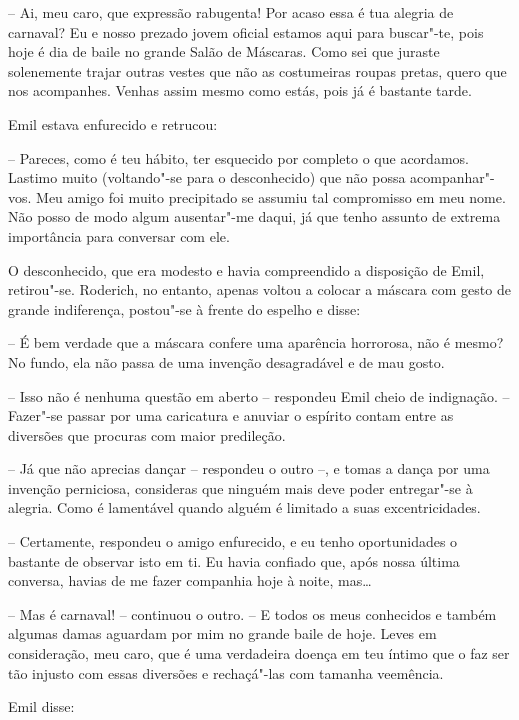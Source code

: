 -- Ai, meu caro, que expressão rabugenta! Por acaso essa é tua
alegria de carnaval? Eu e nosso prezado jovem oficial estamos aqui para
buscar"-te, pois hoje é dia de baile no grande Salão de Máscaras. Como
sei que juraste solenemente trajar outras vestes que não as costumeiras
roupas pretas, quero que nos acompanhes. Venhas assim mesmo como estás,
pois já é bastante tarde.

Emil estava enfurecido e retrucou:

-- Pareces, como é teu hábito, ter esquecido por completo o que
acordamos. Lastimo muito (voltando"-se para o desconhecido) que não
possa acompanhar"-vos. Meu amigo foi muito precipitado se assumiu tal
compromisso em meu nome. Não posso de modo algum ausentar"-me daqui, já
que tenho assunto de extrema importância para conversar com ele.

O desconhecido, que era modesto e havia compreendido a disposição de
Emil, retirou"-se. Roderich, no entanto, apenas voltou a colocar a
máscara com gesto de grande indiferença, postou"-se à frente do espelho
e disse:

-- É bem verdade que a máscara confere uma aparência horrorosa, não
é mesmo? No fundo, ela não passa de uma invenção desagradável e de mau
gosto.

-- Isso não é nenhuma questão em aberto -- respondeu Emil
cheio de indignação. -- Fazer"-se passar por uma caricatura e anuviar o
espírito contam entre as diversões que procuras com maior predileção.

-- Já que não aprecias dançar -- respondeu o outro --, e tomas a dança
por uma invenção perniciosa, consideras que ninguém mais deve poder
entregar"-se à alegria. Como é lamentável quando alguém é limitado a
suas excentricidades.

-- Certamente, respondeu o amigo enfurecido, e eu tenho oportunidades o
bastante de observar isto em ti. Eu havia confiado que, após nossa
última conversa, havias de me fazer companhia hoje à noite, mas\ldots{}

-- Mas é carnaval! -- continuou o outro. -- E todos os meus conhecidos e
também algumas damas aguardam por mim no grande baile de hoje. Leves em
consideração, meu caro, que é uma verdadeira doença em teu íntimo que o
faz ser tão injusto com essas diversões e rechaçá"-las com tamanha veemência.

Emil disse:

